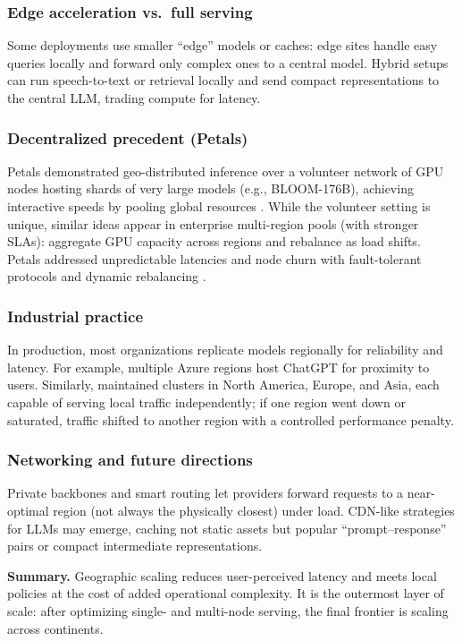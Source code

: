 \subsubsection{Edge acceleration vs.\ full serving}
Some deployments use smaller ``edge'' models or caches: edge sites handle easy queries locally and forward only complex ones to a central model. Hybrid setups can run speech-to-text or retrieval locally and send compact representations to the central LLM, trading compute for latency.

\subsubsection{Decentralized precedent (Petals)}
Petals demonstrated geo-distributed inference over a volunteer network of GPU nodes hosting shards of very large models (e.g., BLOOM-176B), achieving interactive speeds by pooling global resources \cite{pope2023exegpt,helix2023}. While the volunteer setting is unique, similar ideas appear in enterprise multi-region pools (with stronger SLAs): aggregate GPU capacity across regions and rebalance as load shifts. Petals addressed unpredictable latencies and node churn with fault-tolerant protocols and dynamic rebalancing \cite{pope2023exegpt}.

\subsubsection{Industrial practice}
In production, most organizations replicate models regionally for reliability and latency. For example, multiple Azure regions host ChatGPT for proximity to users. Similarly, \ishtar{} maintained clusters in North America, Europe, and Asia, each capable of serving local traffic independently; if one region went down or saturated, traffic shifted to another region with a controlled performance penalty.

\subsubsection{Networking and future directions}
Private backbones and smart routing let providers forward requests to a near-optimal region (not always the physically closest) under load. CDN-like strategies for LLMs may emerge, caching not static assets but popular ``prompt--response'' pairs or compact intermediate representations.

\medskip
\noindent\textbf{Summary.} Geographic scaling reduces user-perceived latency and meets local policies at the cost of added operational complexity. It is the outermost layer of scale: after optimizing single- and multi-node serving, the final frontier is scaling across continents.

